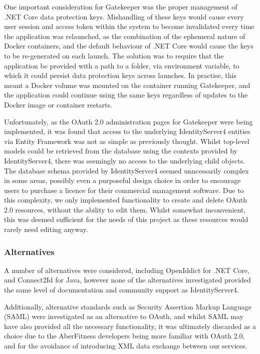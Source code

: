 One important consideration for Gatekeeper was the proper management of .NET Core data protection keys.  Mishandling of these keys would cause every user session and access token within the system to become invalidated every time the application was relaunched, as the combination of the ephemeral nature of Docker containers, and the default behaviour of .NET Core would cause the keys to be re-generated on each launch.  The solution was to require that the application be provided with a path to a folder, via environment variable, to which it could persist data protection keys across launches.  In practise, this meant a Docker volume was mounted on the container running Gatekeeper, and the application could continue using the same keys regardless of updates to the Docker image or container restarts.

Unfortunately, as the OAuth 2.0 administration pages for Gatekeeper were being implemented, it was found that access to the underlying IdentityServer4 entities via Entity Framework was not as simple as previously thought.  Whilst top-level models could be retrieved from the database using the contexts provided by IdentityServer4, there was seemingly no access to the underlying child objects.  The database schema provided by IdentityServer4 seemed unncessarily complex in some areas, possibly even a purposeful design choice in order to encourage users to purchase a licence for their commercial management software\cite{identityserver4adminui}.  Due to this complexity, we only implemented functionality to create and delete OAuth 2.0 resources, without the ability to edit them.  Whilst somewhat inconvenient, this was deemed sufficient for the needs of this project as these resources would rarely need editing anyway.

\subsubsection{Alternatives}

A number of alternatives were considered, including OpenIddict\cite{openiddict} for .NET Core, and Connect2Id\cite{connect2id} for Java, however none of the alternatives investigated provided the same level of documentation and community support as IdentityServer4.

Additionally, alternative standards such as Security Assertion Markup Language (SAML) were investigated as an alternative to OAuth, and whilst SAML may have also provided all the necessary functionality, it was ultimately discarded as a choice due to the AberFitness developers being more familiar with OAuth 2.0, and for the avoidance of introducing XML data exchange between our services.

